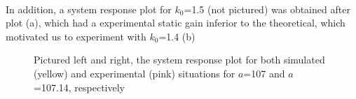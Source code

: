 \documentclass[a4paper,8pt]{extarticle}
\begin{document}
        \\ In addition, a system response plot for $k_0$=1.5 (not pictured) was obtained after plot (a), which had a experimental static gain inferior to the theoretical, which motivated us to experiment with $k_0$=1.4 (b)
         \begin{figure}[ht]
         \centering
            \captionsetup{justification=centering}
            \qquad
             \caption{Pictured left and right, the system response plot for both simulated (yellow) and experimental (pink) situations for $a$=107 and $a$=107.14, respectively}
        \end{figure}
        
         \clearpage
\end{document}
